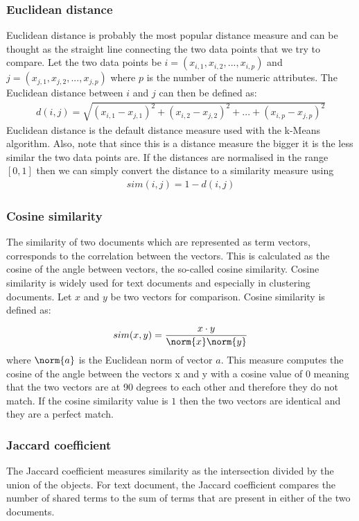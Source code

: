 \subsubsection{Euclidean distance}
Euclidean distance is probably the most popular distance measure and can be thought as the straight line connecting the two data points that we try to compare.
Let the two data points be $i = (x_{i,1}, x_{i,2},...,x_{i,p})$ and $j = (x_{j,1}, x_{j,2},...,x_{j,p})$ where $p$ is the number of the numeric attributes. The Euclidean distance between $i$ and $j$ can then be defined as:\\
\begin{eqnarray}
d(i,j) = \sqrt{(x_{i,1} - x_{j,1})^2 + (x_{i,2} - x_{j,2})^2 + ... +(x_{i,p} - x_{j,p})^2 }
\end{eqnarray} 
Euclidean distance is the default distance measure used with the k-Means algorithm. Also, note that since this is a distance measure the bigger it is the less similar the two data points are. 
If the distances are normalised in the range $[0, 1]$ then we can simply convert the distance to a similarity measure using 
\begin{eqnarray}
sim(i,j) = 1 - d(i, j)
\end{eqnarray} 
\subsubsection{Cosine similarity}
The similarity of two documents which are represented as term vectors, corresponds to the correlation between the vectors. This is calculated as the cosine of the
angle between vectors, the so-called cosine similarity. Cosine similarity is widely used for text documents and especially in clustering documents. Let $x$ and $y$ be 
two vectors for comparison. Cosine similarity is defined as:

\begin{eqnarray}
sim(x,y) = \frac{x \cdot y }{\norm{x} \norm{y}} 
\end{eqnarray} 
where $\norm{a}$ is the Euclidean norm of vector $a$. This measure computes the cosine of the angle between the vectors x and y with a cosine value of $0$ meaning that the two vectors are at 90 degrees to each other and therefore they do not match. If the cosine similarity value is $1$ then the two vectors are identical and they are a perfect match. 

\subsubsection{Jaccard coefficient}
The Jaccard coefficient measures similarity as the intersection divided by the union of the objects. For text document, the Jaccard coefficient compares the number of shared terms to the sum of terms that are present in either of the two documents.

